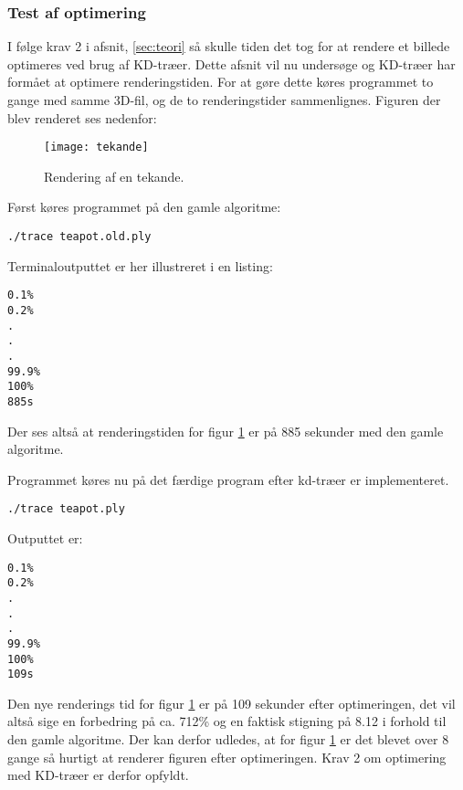 \subsubsection{Test af optimering}

I følge krav 2 i afsnit, \ref{sec:teori} så skulle tiden det tog for at rendere et billede optimeres ved brug af KD-træer. Dette afsnit vil nu undersøge og KD-træer har formået at optimere renderingstiden. For at gøre dette køres programmet to gange med samme 3D-fil, og de to renderingstider sammenlignes. Figuren der blev renderet ses nedenfor:

\begin{figure}[H]
  \centering
  \texttt{[image: tekande]}
  \caption{Rendering af en tekande.}
    \label{fig:tekande}
\end{figure}

Først køres programmet på den gamle algoritme:
\begin{lstlisting}
./trace teapot.old.ply
\end{lstlisting}
Terminaloutputtet er her illustreret i en listing:
\begin{lstlisting}
0.1%
0.2%
.
.
.
99.9%
100%
885s
\end{lstlisting}

Der ses altså at renderingstiden for figur \ref{fig:tekande} er på 885 sekunder med den gamle algoritme.

Programmet køres nu på det færdige program efter kd-træer er implementeret.
\begin{lstlisting}
./trace teapot.ply
\end{lstlisting}
Outputtet er:
\begin{lstlisting}
0.1%
0.2%
.
.
.
99.9%
100%
109s
\end{lstlisting}

Den nye renderings tid for figur \ref{fig:tekande} er på 109 sekunder efter optimeringen, det vil altså sige en forbedring på ca. 712\% og en faktisk stigning på 8.12 i forhold til den gamle algoritme. Der kan derfor udledes, at for figur \ref{fig:tekande} er det blevet over 8 gange så hurtigt at renderer figuren efter optimeringen. Krav 2 om optimering med KD-træer er derfor opfyldt.   